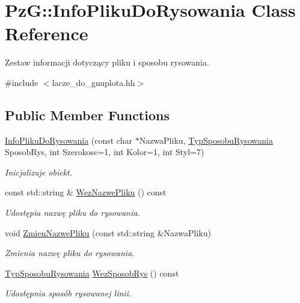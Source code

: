\hypertarget{class_pz_g_1_1_info_pliku_do_rysowania}{}\section{PzG\+::Info\+Pliku\+Do\+Rysowania Class Reference}
\label{class_pz_g_1_1_info_pliku_do_rysowania}


Zestaw informacji dotyczący pliku i sposobu rysowania.  




{\ttfamily \#include $<$lacze\+\_\+do\+\_\+gnuplota.\+hh$>$}

\subsection*{Public Member Functions}
\begin{DoxyCompactItemize}
\item 
\mbox{\hyperlink{class_pz_g_1_1_info_pliku_do_rysowania_a42f5a6ba16403a4364158fa46176ff7a}{Info\+Pliku\+Do\+Rysowania}} (const char $\ast$Nazwa\+Pliku, \mbox{\hyperlink{namespace_pz_g_a53d89f50686ddd39301f9706cc1247dc}{Typ\+Sposobu\+Rysowania}} Sposob\+Rys, int Szerokosc=1, int Kolor=1, int Styl=7)
\begin{DoxyCompactList}\small\item\em Inicjalizuje obiekt. \end{DoxyCompactList}\item 
const std\+::string \& \mbox{\hyperlink{class_pz_g_1_1_info_pliku_do_rysowania_a714aaa4c8e7bbd167ccbb1e797ca158c}{Wez\+Nazwe\+Pliku}} () const
\begin{DoxyCompactList}\small\item\em Udostępia nazwę pliku do rysowania. \end{DoxyCompactList}\item 
void \mbox{\hyperlink{class_pz_g_1_1_info_pliku_do_rysowania_ae734c69f5cecf9c0584e3a7f433340ea}{Zmien\+Nazwe\+Pliku}} (const std\+::string \&Nazwa\+Pliku)
\begin{DoxyCompactList}\small\item\em Zmienia nazwę pliku do rysowania. \end{DoxyCompactList}\item 
\mbox{\hyperlink{namespace_pz_g_a53d89f50686ddd39301f9706cc1247dc}{Typ\+Sposobu\+Rysowania}} \mbox{\hyperlink{class_pz_g_1_1_info_pliku_do_rysowania_a04e42126ae7873117b96c39f31e0a206}{Wez\+Sposob\+Rys}} () const
\begin{DoxyCompactList}\small\item\em Udostępnia sposób rysowanej linii. \end{DoxyCompactList}\item 

\end{DoxyCompactItemize}
